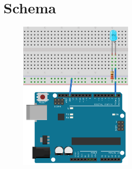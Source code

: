 \section{Schema} %
\label{sec:schema}
\begin{figure}
    \includegraphics[width=0.5\textwidth]{res/img/led}
\end{figure}
